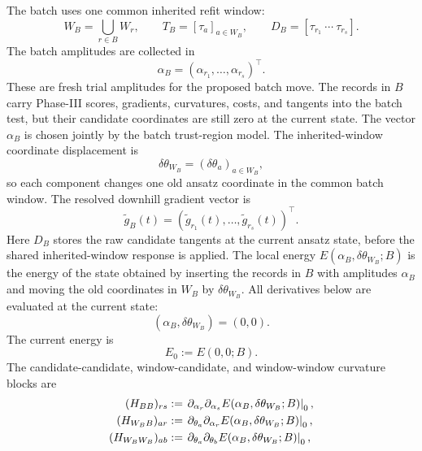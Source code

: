 \documentclass[10pt,twocolumn]{article}
\begin{document}
The batch uses one common inherited refit window:
\begin{equation}
W_B=\bigcup_{r\in B}W_r,
\qquad
T_B=[\tau_a]_{a\in W_B},
\qquad
D_B=[\tau_{r_1}\ \cdots\ \tau_{r_s}].
\label{eq:p1_batch_window}
\end{equation}
The batch amplitudes are collected in
\begin{equation}
\alpha_B=(\alpha_{r_1},\ldots,\alpha_{r_s})^\top .
\label{eq:p1_batch_alpha}
\end{equation}
These are fresh trial amplitudes for the proposed batch move.  The records in
\(B\) carry Phase-III scores, gradients, curvatures, costs, and tangents into
the batch test, but their candidate coordinates are still zero at the current
state.  The vector \(\alpha_B\) is chosen jointly by the batch trust-region
model.
The inherited-window coordinate displacement is
\begin{equation}
\delta\theta_{W_B}
=\left(\delta\theta_a\right)_{a\in W_B},
\label{eq:p1_batch_window_displacement}
\end{equation}
so each component changes one old ansatz coordinate in the common batch
window.  The resolved downhill gradient vector is
\begin{equation}
\widetilde g_B(t)
=
\left(
\widetilde g_{r_1}(t),\ldots,\widetilde g_{r_s}(t)
\right)^\top .
\label{eq:p1_batch_gradient}
\end{equation}
Here \(D_B\) stores the raw candidate tangents at the current ansatz state,
before the shared inherited-window response is applied.
The local energy \(E(\alpha_B,\delta\theta_{W_B};B)\) is the energy of the
state obtained by inserting the records in \(B\) with amplitudes \(\alpha_B\)
and moving the old coordinates in \(W_B\) by \(\delta\theta_{W_B}\).  All
derivatives below are evaluated at the current state:
\[
(\alpha_B,\delta\theta_{W_B})=(0,0).
\]
The current energy is
\[
E_0:=E(0,0;B).
\]
The candidate-candidate, window-candidate, and window-window curvature blocks
are
\begin{align}
(H_{BB})_{rs}
&:=
\left.
\partial_{\alpha_r}\partial_{\alpha_s}
E(\alpha_B,\delta\theta_{W_B};B)
\right|_{0},
\notag\\
(H_{W_BB})_{a r}
&:=
\left.
\partial_{\theta_a}\partial_{\alpha_r}
E(\alpha_B,\delta\theta_{W_B};B)
\right|_{0},
\notag\\
(H_{W_BW_B})_{ab}
&:=
\left.
\partial_{\theta_a}\partial_{\theta_b}
E(\alpha_B,\delta\theta_{W_B};B)
\right|_{0},
\label{eq:p1_batch_hessian_blocks}
\end{align}
\end{document}
